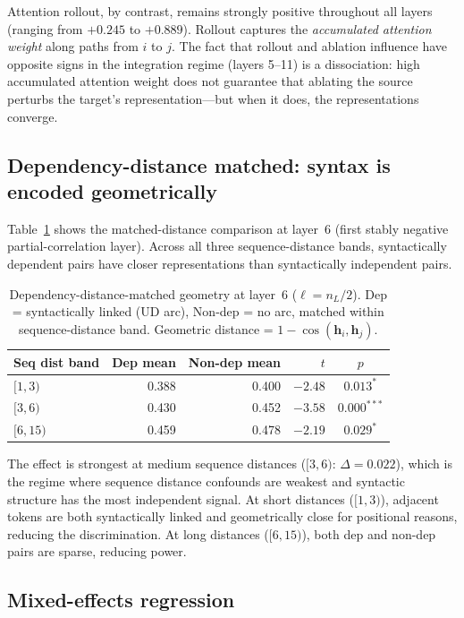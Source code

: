 \documentclass[11pt,a4paper]{article}
\begin{document}
Attention rollout, by contrast, remains strongly positive throughout all layers
(ranging from $+0.245$ to $+0.889$).
Rollout captures the \emph{accumulated attention weight} along paths from $i$ to $j$.
The fact that rollout and ablation influence have opposite signs in the integration
regime (layers 5--11) is a dissociation: high accumulated attention weight does
not guarantee that ablating the source perturbs the target's representation---but
when it does, the representations converge.

\subsection{Dependency-distance matched: syntax is encoded geometrically}

Table~\ref{tab:matched} shows the matched-distance comparison at layer~6
(first stably negative partial-correlation layer).
Across all three sequence-distance bands, syntactically dependent pairs
have closer representations than syntactically independent pairs.

\begin{table}[h]
\centering
\caption{Dependency-distance-matched geometry at layer~6 ($\ell = n_L/2$).
  Dep = syntactically linked (UD arc), Non-dep = no arc, matched within
  sequence-distance band. Geometric distance = $1 - \cos(\mathbf{h}_i, \mathbf{h}_j)$.}
\label{tab:matched}
\begin{tabular}{lrrrc}
\toprule
Seq dist band & Dep mean & Non-dep mean & $t$ & $p$ \\
\midrule
$[1, 3)$  & 0.388 & 0.400 & $-2.48$ & $0.013^*$ \\
$[3, 6)$  & 0.430 & 0.452 & $-3.58$ & $0.000^{***}$ \\
$[6, 15)$ & 0.459 & 0.478 & $-2.19$ & $0.029^*$ \\
\bottomrule
\end{tabular}
\end{table}

The effect is strongest at medium sequence distances ($[3,6)$: $\Delta = 0.022$),
which is the regime where sequence distance confounds are weakest and syntactic
structure has the most independent signal.
At short distances ($[1,3)$), adjacent tokens are both syntactically linked
and geometrically close for positional reasons, reducing the discrimination.
At long distances ($[6,15)$), both dep and non-dep pairs are sparse,
reducing power.

\subsection{Mixed-effects regression}
\end{document}
